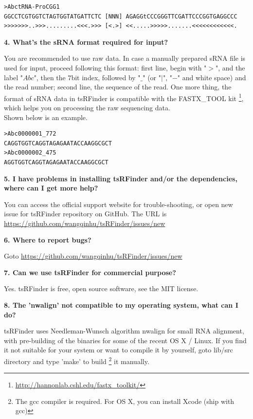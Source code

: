 \documentclass[11pt, a4paper]{article}
\begin{document}
{\scriptsize \begin{tcolorbox}[colback=blue!5!white,colframe=blue!75!black,title=tRNA example]
\begin{verbatim}
>AbctRNA-ProCGG1
GGCCTCGTGGTCTAGTGGTATGATTCTC [NNN] AGAGGtCCCGGGTTCGATTCCCGGTGAGGCCC
>>>>>>>..>>>.........<<<.>>> [<.>] <<.....>>>>>.......<<<<<<<<<<<<.
\end{verbatim}
\end{tcolorbox}}

\textbf{4. What's the sRNA format required for input?}

You are recommended to use raw data. In case a manually prepared sRNA file is used for input, proceed following this format: first line, begin with "$>$", and the label "$Abc$", then the 7\-bit index, followed by "$\_$" (or "$|$", "$-$" and white space) and the read number; second line, the sequence of the read. One more thing, the format of sRNA data in tsRFinder is compatible with the FASTX\_TOOL kit \footnote{\url{http://hannonlab.cshl.edu/fastx_toolkit/}}, which helps you on processing the raw sequencing data.\\
Shown below is an example.

{\scriptsize \begin{tcolorbox}[colback=blue!5!white,colframe=blue!75!black,title=sRNA example]
\begin{verbatim}
>Abc0000001_772
CAGGTGGTCAGGTAGAGAATACCAAGGCGCT
>Abc0000002_475
AGGTGGTCAGGTAGAGAATACCAAGGCGCT
\end{verbatim}
\end{tcolorbox}}


\textbf{5. I have problems in installing tsRFinder and/or the dependencies, where can I get more help?}

You can access the official support website for trouble-shooting, or open new issue for tsRFinder repository on GitHub. The URL is \url{https://github.com/wangqinhu/tsRFinder/issues/new}

\textbf{6. Where to report bugs?}

Goto \url{https://github.com/wangqinhu/tsRFinder/issues/new}

\textbf{7. Can we use tsRFinder for commercial purpose?}

Yes. tsRFinder is free, open source software, see the MIT license.

\textbf{8. The 'nwalign' not compatible to my operating system, what can I do?}
 
tsRFinder uses Needleman-Wunsch algorithm nwalign for small RNA alignment, with pre-building of the binaries for some of the recent OS X / Linux. If you find it not suitable for your system or want to compile it by yourself, goto lib/src directory and type 'make' to build \footnote{The gcc compiler is required. For OS X, you can install Xcode (ship with gcc)} it manually.
\end{document}
